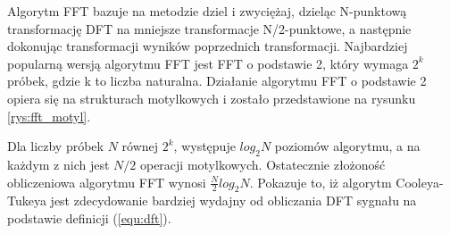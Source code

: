 Algorytm FFT bazuje na metodzie dziel i zwyciężaj, dzieląc N-punktową transformację DFT na mniejsze transformacje N/2-punktowe, a następnie dokonując transformacji wyników poprzednich transformacji. Najbardziej popularną wersją algorytmu FFT jest FFT o podstawie 2, który wymaga $2^{k}$ próbek, gdzie k to liczba naturalna. Działanie algorytmu FFT o podstawie 2 opiera się na strukturach motylkowych i zostało przedstawione na rysunku \ref{rys:fft_motyl}.

Dla liczby próbek $N$ równej $2^{k}$, występuje $log_{2}N$ poziomów algorytmu, a na każdym z nich jest $N/2$ operacji motylkowych. Ostatecznie złożoność obliczeniowa algorytmu FFT wynosi $\frac{N}{2}log_{2}N$. Pokazuje to, iż algorytm Cooleya-Tukeya jest zdecydowanie bardziej wydajny od obliczania DFT sygnału na podstawie definicji (\ref{equ:dft}).
